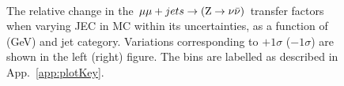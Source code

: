 \begin{figure}[!h]
  \centering
   ~~
  \\

  \caption{\label{fig:tfSyst_jec_mumuToZinv} The relative change in
  the $\mu\mu + jets \rightarrow ({\text Z} \rightarrow \nu\bar{\nu})$ transfer
  factors when varying JEC in MC within its uncertainties, as a function of \scalht (GeV) and jet category. 
  Variations corresponding to $+1\sigma$ ($-1\sigma$) are shown in the left (right) figure. The bins are
    labelled as described in App.~\ref{app:plotKey}.
  }
\end{figure}

